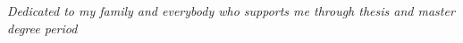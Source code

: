\vspace{17cm}

\begin{flushright}
\itshape{ Dedicated to my family and everybody who supports me through thesis and master degree period}
\end{flushright}